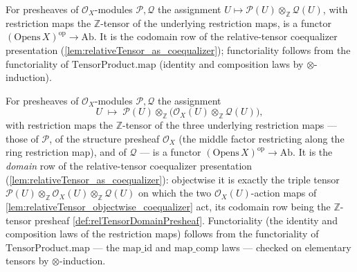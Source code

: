 \begin{definition}
  \label{def:relTensorDomainPresheaf}
  For presheaves of \(\mathcal{O}_X\)-modules \(\mathcal{P}, \mathcal{Q}\) the
  assignment \(U \mapsto \mathcal{P}(U) \otimes_{\mathbb{Z}} \mathcal{Q}(U)\),
  with restriction maps the \(\mathbb{Z}\)-tensor of the underlying restriction
  maps, is a functor \((\mathrm{Opens}\,X)^{\mathrm{op}} \to \mathrm{Ab}\). It is
  the codomain row of the relative-tensor coequalizer presentation
  (\cref{lem:relativeTensor_as_coequalizer}); functoriality follows from the
  functoriality of \(\mathrm{TensorProduct.map}\) (identity and composition laws
  by \(\otimes\)-induction).
\end{definition}

\begin{definition}
  \label{def:relTensorTriplePresheaf}
  For presheaves of \(\mathcal{O}_X\)-modules \(\mathcal{P}, \mathcal{Q}\) the
  assignment
  \[
    U \;\longmapsto\;
      \mathcal{P}(U) \otimes_{\mathbb{Z}}
        \bigl(\mathcal{O}_X(U) \otimes_{\mathbb{Z}} \mathcal{Q}(U)\bigr),
  \]
  with restriction maps the \(\mathbb{Z}\)-tensor of the three underlying
  restriction maps --- those of \(\mathcal{P}\), of the structure presheaf
  \(\mathcal{O}_X\) (the middle factor restricting along the ring restriction
  map), and of \(\mathcal{Q}\) --- is a functor
  \((\mathrm{Opens}\,X)^{\mathrm{op}} \to \mathrm{Ab}\). It is the \emph{domain}
  row of the relative-tensor coequalizer presentation
  (\cref{lem:relativeTensor_as_coequalizer}): objectwise it is exactly the
  triple tensor \(\mathcal{P}(U) \otimes_{\mathbb{Z}} \mathcal{O}_X(U)
  \otimes_{\mathbb{Z}} \mathcal{Q}(U)\) on which the two
  \(\mathcal{O}_X(U)\)-action maps of
  \cref{lem:relativeTensor_objectwise_coequalizer} act, its codomain row being
  the \(\mathbb{Z}\)-tensor presheaf \cref{def:relTensorDomainPresheaf}.
  Functoriality (the identity and composition laws of the restriction maps)
  follows from the functoriality of \(\mathrm{TensorProduct.map}\) --- the
  \(\mathrm{map\_id}\) and \(\mathrm{map\_comp}\) laws --- checked on elementary
  tensors by \(\otimes\)-induction.
\end{definition}

